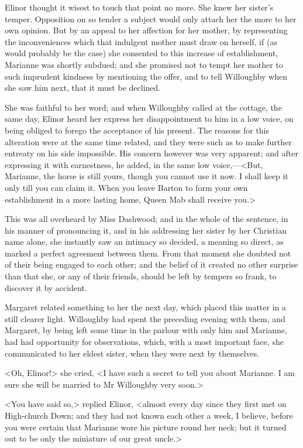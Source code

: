 Elinor thought it wisest to touch that point no more. She knew her sister's temper. Opposition on so tender a subject would only attach her the more to her own opinion. But by an appeal to her affection for her mother, by representing the inconveniences which that indulgent mother must draw on herself, if (as would probably be the case) she consented to this increase of establishment, Marianne was shortly subdued; and she promised not to tempt her mother to such imprudent kindness by mentioning the offer, and to tell Willoughby when she saw him next, that it must be declined.

She was faithful to her word; and when Willoughby called at the cottage, the same day, Elinor heard her express her disappointment to him in a low voice, on being obliged to forego the acceptance of his present. The reasons for this alteration were at the same time related, and they were such as to make further entreaty on his side impossible. His concern however was very apparent; and after expressing it with earnestness, he added, in the same low voice,—<But, Marianne, the horse is still yours, though you cannot use it now. I shall keep it only till you can claim it. When you leave Barton to form your own establishment in a more lasting home, Queen Mab shall receive you.>

This was all overheard by Miss Dashwood; and in the whole of the sentence, in his manner of pronouncing it, and in his addressing her sister by her Christian name alone, she instantly saw an intimacy so decided, a meaning so direct, as marked a perfect agreement between them. From that moment she doubted not of their being engaged to each other; and the belief of it created no other surprise than that she, or any of their friends, should be left by tempers so frank, to discover it by accident.

Margaret related something to her the next day, which placed this matter in a still clearer light. Willoughby had spent the preceding evening with them, and Margaret, by being left some time in the parlour with only him and Marianne, had had opportunity for observations, which, with a most important face, she communicated to her eldest sister, when they were next by themselves.

<Oh, Elinor!> she cried, <I have such a secret to tell you about Marianne. I am sure she will be married to Mr Willoughby very soon.>

<You have said so,> replied Elinor, <almost every day since they first met on High-church Down; and they had not known each other a week, I believe, before you were certain that Marianne wore his picture round her neck; but it turned out to be only the miniature of our great uncle.>


